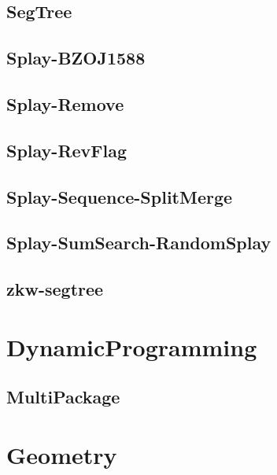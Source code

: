 \subsection{SegTree}
\raggedbottom
\hrulefill
\subsection{Splay-BZOJ1588}
\raggedbottom
\hrulefill
\subsection{Splay-Remove}
\raggedbottom
\hrulefill
\subsection{Splay-RevFlag}
\raggedbottom
\hrulefill
\subsection{Splay-Sequence-SplitMerge}
\raggedbottom
\hrulefill
\subsection{Splay-SumSearch-RandomSplay}
\raggedbottom
\hrulefill
\subsection{zkw-segtree}
\raggedbottom
\hrulefill

\section{DynamicProgramming}
\subsection{MultiPackage}
\raggedbottom
\hrulefill

\section{Geometry}
